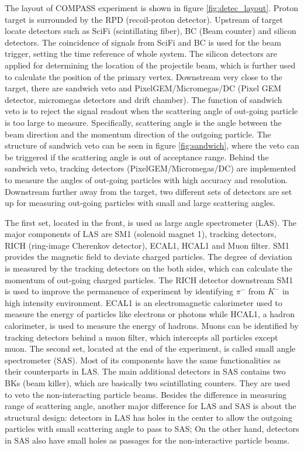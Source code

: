 The layout of COMPASS experiment is shown in figure \ref{fig:detec_layout}. Proton target is surrounded by the RPD (recoil-proton detector). Upstream of target locate detectors such as SciFi (scintillating fiber), BC (Beam counter) and silicon detectors. The coincidence of signals from SciFi and BC is used for the beam trigger, setting the time reference of whole system. The silicon detectors are applied for determining the location of the projectile beam, which is further used to calculate the position of the primary vertex. Downstream very close to the target, there are sandwich veto and PixelGEM/Micromegas/DC (Pixel GEM detector, micromegas detectors and drift chamber). The function of sandwich veto is to reject the signal readout when the scattering angle of out-going particle is too large to measure. Specifically, scattering angle is the angle between the beam direction and the momentum direction of the outgoing particle. The structure of sandwich veto can be seen in figure \ref{fig:sandwich}, where the veto can be triggered if the scattering angle is out of acceptance range. Behind the sandwich veto, tracking detectors (PixelGEM/Micromegas/DC) are implemented to measure the angles of out-going particles with high accuracy and resolution. Downstream further away from the target, two different sets of detectors are set up for measuring out-going particles with small and large scattering angles. 

The first set, located in the front, is used as large angle spectrometer (LAS). The major components of LAS are SM1 (solenoid magnet 1), tracking detectors, RICH (ring-image Cherenkov detector), ECAL1, HCAL1 and Muon filter. SM1 provides the magnetic field to deviate charged particles. The degree of deviation is measured by the tracking detectors on the both sides, which can calculate the momentum of out-going charged particles. The RICH detector downstream SM1 is used to improve the permanence of experiment by identifying $\pi^-$ from $K^-$ in high intensity environment\cite{RICH}. ECAL1 is an electromagnetic calorimeter used to measure the energy of particles like electrons or photons while HCAL1, a hadron calorimeter, is used to measure the energy of hadrons. Muons can be identified by tracking detectors behind a muon filter, which intercepts all particles except muon. The second set, located at the end of the experiment, is called small angle spectrometer (SAS). Most of its components have the same functionalities as their counterparts in LAS. The main additional detectors in SAS contains two BKs (beam killer), which are basically two scintillating counters. They are used to veto the non-interacting particle beams\cite{sandwich}. Besides the difference in measuring range of scattering angle, another major difference for LAS and SAS is about the structural design: detectors in LAS has holes in the center to allow the outgoing particles with small scattering angle to pass to SAS; On the other hand, detectors in SAS also have  small holes as passages for the non-interactive particle beams. 




